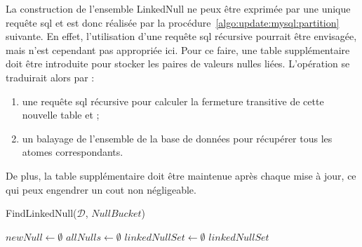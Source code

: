 \begin{remark}
    La construction de l'ensemble \textsf{LinkedNull} ne peux être exprimée par une unique requête \gls{sql} et est donc réalisée par la procédure~\ref{algo:update:mysql:partition} suivante.
    En effet, l'utilisation d'une requête \gls{sql} récursive pourrait être envisagée, mais n'est cependant pas appropriée ici.
    Pour ce faire, une table supplémentaire doit être introduite pour stocker les paires de valeurs nulles liées.
    L'opération se traduirait alors par :
    \begin{enumerate}
        \item une requête \gls{sql} récursive pour calculer la fermeture transitive de cette nouvelle table et ;
        \item un balayage de l'ensemble de la base de données pour récupérer tous les atomes correspondants.
    \end{enumerate}
    De plus, la table supplémentaire doit être maintenue après chaque mise à jour, ce qui peux engendrer un cout non négligeable.
\end{remark}

\begin{procedure}[htb]
	\caption{FindLinkedNull($\mathcal{D}$, $NullBucket$)}
    \label{algo:update:mysql:partition}

	$newNull \gets \emptyset$ \;
    $allNulls \gets \emptyset$ \;
    $linkedNullSet \gets \emptyset$ \;
	\Return $linkedNullSet$ \;
\end{procedure}

